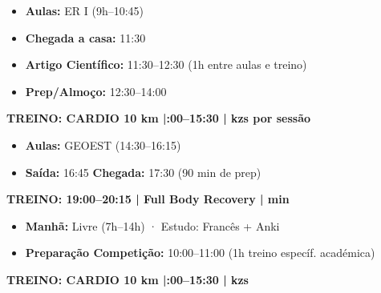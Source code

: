 \documentclass[a4paper,11pt]{article}
\newcommand{\badge}[2]{%
  \colorbox{#1}{\color{white}\footnotesize\textbf{\strut\;#2\;}}%
}
\begin{document}
\begin{tcolorbox}[daybox, title={\badge{cardio}{QUINTA} \quad CARDIO DAY + Artigo Científico}]
  \begin{itemize}[leftmargin=1em, itemsep=2pt]
    \item \textbf{Aulas:} ER I (9h--10:45)
    \item \textbf{Chegada a casa:} 11:30
    \item \textbf{Artigo Científico:} 11:30--12:30 (1h entre aulas e treino)
    \item \textbf{Prep/Almoço:} 12:30--14:00
  \end{itemize}
  \vspace{4pt}
  \begin{tcolorbox}[enhanced, colback=cardio!10, colframe=cardio, sharp corners, boxrule=1pt, left=5pt]
    \textbf{TREINO: CARDIO 10 km \;|:00--15:30 \;| kzs por sessão}
  \end{tcolorbox}
\end{tcolorbox}

\vspace{6pt}

\begin{tcolorbox}[daybox, title={\badge{recovery}{SEXTA} \quad Full Body Recovery}]
  \begin{itemize}[leftmargin=1em, itemsep=2pt]
    \item \textbf{Aulas:} GEOEST (14:30--16:15)
    \item \textbf{Saída:} 16:45 \quad \textbf{Chegada:} 17:30 (90 min de prep)
  \end{itemize}
  \vspace{4pt}
  \begin{tcolorbox}[enhanced, colback=recovery!10, colframe=recovery, sharp corners, boxrule=1pt, left=5pt]
    \textbf{TREINO: 19:00--20:15 \;|\; Full Body Recovery \;| min}
  \end{tcolorbox}
\end{tcolorbox}

\vspace{6pt}

\begin{tcolorbox}[daybox, title={\badge{cardio}{SÁBADO} \quad CARDIO DAY + Competição}]
  \begin{itemize}[leftmargin=1em, itemsep=2pt]
    \item \textbf{Manhã:} Livre (7h--14h) · Estudo: Francês + Anki
    \item \textbf{Preparação Competição:} 10:00--11:00 (1h treino específ. académica)
  \end{itemize}
  \vspace{4pt}
  \begin{tcolorbox}[enhanced, colback=cardio!10, colframe=cardio, sharp corners, boxrule=1pt, left=5pt]
    \textbf{TREINO: CARDIO 10 km \;|:00--15:30 \;| kzs}
  \end{tcolorbox}
\end{tcolorbox}
\end{document}
